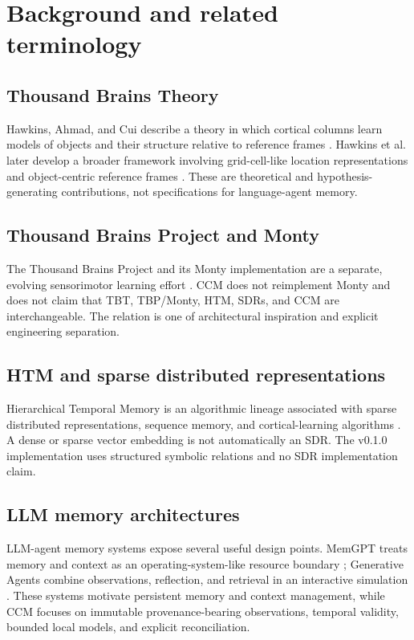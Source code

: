 \section{Background and related terminology}

\subsection{Thousand Brains Theory}

Hawkins, Ahmad, and Cui describe a theory in which cortical columns learn models of objects and their structure relative to reference frames \citep{hawkins2017columns}. Hawkins et al. later develop a broader framework involving grid-cell-like location representations and object-centric reference frames \citep{hawkins2019framework}. These are theoretical and hypothesis-generating contributions, not specifications for language-agent memory.

\subsection{Thousand Brains Project and Monty}

The Thousand Brains Project and its Monty implementation are a separate, evolving sensorimotor learning effort \citep{clay2024tbp,leadholm2026systems}. CCM does not reimplement Monty and does not claim that TBT, TBP/Monty, HTM, SDRs, and CCM are interchangeable. The relation is one of architectural inspiration and explicit engineering separation.

\subsection{HTM and sparse distributed representations}

Hierarchical Temporal Memory is an algorithmic lineage associated with sparse distributed representations, sequence memory, and cortical-learning algorithms \citep{ahmad2016sdr,numenta2010htm}. A dense or sparse vector embedding is not automatically an SDR. The v0.1.0 implementation uses structured symbolic relations and no SDR implementation claim.

\subsection{LLM memory architectures}

LLM-agent memory systems expose several useful design points. MemGPT treats memory and context as an operating-system-like resource boundary \citep{packer2023memgpt}; Generative Agents combine observations, reflection, and retrieval in an interactive simulation \citep{park2023generative}. These systems motivate persistent memory and context management, while CCM focuses on immutable provenance-bearing observations, temporal validity, bounded local models, and explicit reconciliation.

